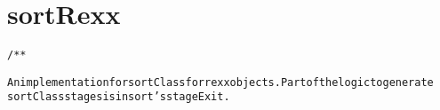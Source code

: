 \section{sortRexx}
\begin{shaded}
\begin{alltt}
/**

An implementation for sortClass for rexx objects.  Part of the logic to generate
sortClass stages is in sort's stageExit.

\end{alltt}
\end{shaded}
